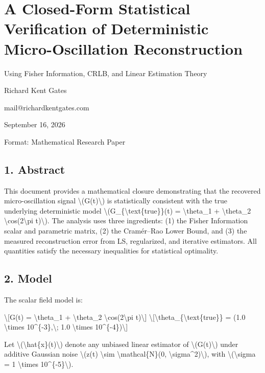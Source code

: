 \documentclass[
  10pt,
]{article}
\author{}
\date{}
\begin{document}
\hypertarget{a-closed-form-statistical-verification-of-deterministic-micro-oscillation-reconstruction}{%
\section{A Closed-Form Statistical Verification of Deterministic
Micro-Oscillation
Reconstruction}\label{a-closed-form-statistical-verification-of-deterministic-micro-oscillation-reconstruction}}

Using Fisher Information, CRLB, and Linear Estimation Theory

Richard Kent Gates

mail@richardkentgates.com

September 16, 2026

Format: Mathematical Research Paper

\hypertarget{abstract}{%
\subsection{1. Abstract}\label{abstract}}

This document provides a mathematical closure demonstrating that the
recovered micro-oscillation signal \textbackslash(G(t)\textbackslash) is
statistically consistent with the true underlying deterministic model
\textbackslash(G\_\{\textbackslash text\{true\}\}(t) =
\textbackslash theta\_1 + \textbackslash theta\_2
\textbackslash cos(2\textbackslash pi t)\textbackslash). The analysis
uses three ingredients: (1) the Fisher Information scalar and parametric
matrix, (2) the Cramér--Rao Lower Bound, and (3) the measured
reconstruction error from LS, regularized, and iterative estimators. All
quantities satisfy the necessary inequalities for statistical
optimality.

\hypertarget{model}{%
\subsection{2. Model}\label{model}}

The scalar field model is:

\textbackslash{[}G(t) = \textbackslash theta\_1 +
\textbackslash theta\_2 \textbackslash cos(2\textbackslash pi
t)\textbackslash{]}
\textbackslash{[}\textbackslash theta\_\{\textbackslash text\{true\}\} =
(1.0 \textbackslash times 10\^{}\{-3\},\textbackslash; 1.0
\textbackslash times 10\^{}\{-4\})\textbackslash{]}

Let \textbackslash(\textbackslash hat\{x\}(t)\textbackslash) denote any
unbiased linear estimator of \textbackslash(G(t)\textbackslash) under
additive Gaussian noise \textbackslash(z(t) \textbackslash sim
\textbackslash mathcal\{N\}(0,
\textbackslash sigma\^{}2)\textbackslash), with
\textbackslash(\textbackslash sigma = 1 \textbackslash times
10\^{}\{-5\}\textbackslash).
\end{document}
